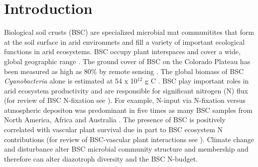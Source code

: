 \section{Introduction}
Biological soil crusts (BSC) are specialized microbial mat communitites
that form at the soil surface in arid environmets and fill a variety of
important ecological functions in arid ecosystems. BSC occupy plant
interspaces and cover a wide, global geographic range
\citep{garcia2003estimates}. The ground cover of BSC on the Colorado
Plateau has been measured as high as 80\% by remote sensing
\citep{karnieli2001}. The global biomass of BSC \textit{Cyanobacteria}
alone is estimated at 54 x 10$^{12}$ g C \citep{garcia2003estimates}.
BSC play important roles in arid ecosystem productivity and are
responsible for significant nitrogen (N) flux (for review of BSC
N-fixation see \citet{belnap2003}). For example, N-input via N-fixation
versus atmospheric depositon was predominant in five times as many BSC
samples from North America, Africa and Australia \citep{Evans_1999}.
The presence of BSC is positively correlated with vascular plant
survival due in part to BSC ecosystem N contributions (for review of
BSC-vascular plant interactions see \citet{BelnapVascular}). Climate
change and disturbance alter BSC microbial community structure and
membership and therefore can alter diazotroph diversity and the BSC
N-budget.

